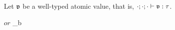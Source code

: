 \begin{lemma}
  \label{CFAtom}
  Let $\mathfrak{v}$ be a well-typed atomic value,
  that is, $\cdot;\cdot;\cdot \vdash \mathfrak{v} : \mathit{\tau}$.
  \begin{enumerate}
    {\cfitem
      {\atval}
      {}
      {\primop$ or $}}
    {\cfitem
      {\atval}
      {}
      {}}
    {\cfitem
      {\atval}
      {}
      {}}
    {
      {}
      {\dsum
        {\sequence{\idx}}
        {\val_b}
        {}}}
    {\cfitem
      {\atval}
      {\basetype}
      {\baseval}}
  \end{enumerate}
\end{lemma}
